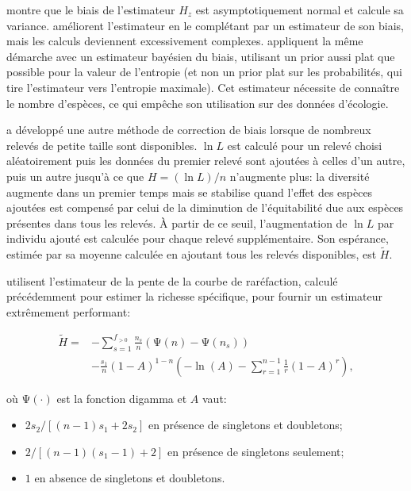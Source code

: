 \documentclass[
  11pt,
  american,
  a4paper,
  extrafontsizes,onecolumn,openright
  ]{memoir}
\providecommand{\tightlist}{%
  \setlength{\itemsep}{0pt}\setlength{\parskip}{0pt}}
\newlength{\rf}
\begin{document}
\textcite{Zhang2013a} montre que le biais de l'estimateur \(H_z\) est asymptotiquement normal et calcule sa variance.
\textcite{Zhang2013} améliorent l'estimateur en le complétant par un estimateur de son biais, mais les calculs deviennent excessivement complexes.
\textcite{Vinck2012} appliquent la même démarche avec un estimateur bayésien du biais, utilisant un prior aussi plat que possible pour la valeur de l'entropie (et non un prior plat sur les probabilités, qui tire l'estimateur vers l'entropie maximale).
Cet estimateur nécessite de connaître le nombre d'espèces, ce qui empêche son utilisation sur des données d'écologie.

\textcite{Pielou1966} a développé une autre méthode de correction de biais lorsque de nombreux relevés de petite taille sont disponibles.
\(\ln{L}\) est calculé pour un relevé choisi aléatoirement puis les données du premier relevé sont ajoutées à celles d'un autre, puis un autre jusqu'à ce que \(H=(\ln{L}) / n\) n'augmente plus: la diversité augmente dans un premier temps mais se stabilise quand l'effet des espèces ajoutées est compensé par celui de la diminution de l'équitabilité due aux espèces présentes dans tous les relevés.
À partir de ce seuil, l'augmentation de \(\ln{L}\) par individu ajouté est calculée pour chaque relevé supplémentaire.
Son espérance, estimée par sa moyenne calculée en ajoutant tous les relevés disponibles, est \(\tilde{H}\).

\textcite{Chao2013} utilisent l'estimateur de la pente de la courbe de raréfaction, calculé précédemment \autocite{Chao2012b} pour estimer la richesse spécifique, pour fournir un estimateur extrêmement performant:

\begin{align}
  \label{eq:Chao2013}
  \tilde{H}
  = &-\sum_{s=1}^{f_{>0}}
    {\frac{n_s}{n} \left( \mathrm{\Psi}\left( n \right) - \mathrm{\Psi}\left( n_s \right) \right)} \\
    &-\frac{s_{1}}{n} {\left(1 - A \right)}^{1 - n} \left( 
      -\ln\left( A \right) -\sum^{n-1}_{r=1}{\frac{1}{r}{\left( 1 - A \right)}^r} \right
    ),
\end{align}

où \(\mathrm{\Psi}(\cdot)\) est la fonction digamma et \(A\) vaut:

\begin{itemize}
\tightlist
\item
  \(2s_{2} / [(n - 1) s_{1} + 2 s_{2}]\) en présence de singletons et doubletons;
\item
  \(2 / [(n - 1) (s_1 -1) + 2]\) en présence de singletons seulement;
\item
  \(1\) en absence de singletons et doubletons.
\end{itemize}
\end{document}
